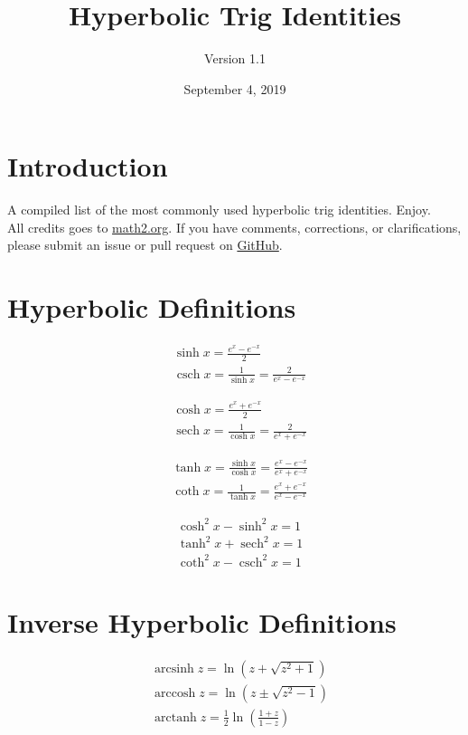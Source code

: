 \documentclass[12pt]{article}
\title{Hyperbolic Trig Identities}
\author{Version 1.1}
\date{September 4, 2019}
\begin{document}
\maketitle

\section{Introduction}
A compiled list of the most commonly used hyperbolic trig identities. Enjoy. \\

All credits goes to \href{http://math2.org/math/trig/hyperbolics.htm}{math2.org}. If you have comments, corrections, or clarifications, please submit an issue or pull request on \href{https://github.com/chemclub/calculus}{GitHub}.

\large
\section{Hyperbolic Definitions}

\begin{align*}
& \sinh x = \frac{e^x-e^{-x}}{2} \\
& \operatorname{csch}x = \frac{1}{\sinh x} = \frac{2}{e^x-e^{-x}}
\end{align*}

\begin{align*}
& \cosh x = \frac{e^x+e^{-x}}{2} \\
& \operatorname{sech}x = \frac{1}{\cosh x} = \frac{2}{e^x+e^{-x}}
\end{align*}

\begin{align*}
& \tanh x = \frac{\sinh x}{\cosh x} = \frac{e^x-e^{-x}}{e^x+e^{-x}} \\
& \operatorname{coth}x = \frac{1}{\tanh x} = \frac{e^x+e^{-x}}{e^x-e^{-x}}
\end{align*}


\begin{align*}
& \cosh^2x-\sinh^2x = 1 \\
& \tanh^2x+\operatorname{sech}^2x = 1 \\
& \coth^2x-\operatorname{csch}^2x = 1
\end{align*}


\section{Inverse Hyperbolic Definitions}

\begin{align*}
& \operatorname{arcsinh}z=\ln\left(z+\sqrt{z^2+1}\right) \\
& \operatorname{arccosh}z=\ln\left(z\pm\sqrt{z^2-1}\right) \\
& \operatorname{arctanh}z=\frac{1}{2}\ln\left(\frac{1+z}{1-z}\right)
\end{align*}
\end{document}
